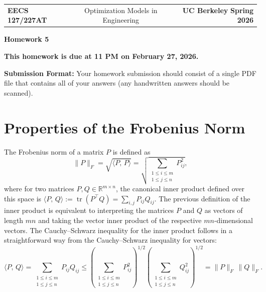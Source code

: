 \documentclass[10pt]{article}
\theoremstyle{definition}
\theoremstyle{plain}
\newcommand{\RR}{\mathbb{R}}
\DeclareMathOperator{\trace}{tr}
\begin{document}
\begin{center}
\begin{tabular}{lcr}
\textbf{EECS 127/227AT} & Optimization Models in Engineering & \textbf{UC Berkeley} \quad \textbf{Spring 2026}
\end{tabular}

\medskip
{\Large \textbf{Homework 5}}
\end{center}

\begin{tcolorbox}
\textbf{This homework is due at 11 PM on February 27, 2026.}

\textbf{Submission Format:} Your homework submission should consist of a single PDF file that contains all of your answers (any handwritten answers should be scanned).
\end{tcolorbox}

\section{Properties of the Frobenius Norm}

The Frobenius norm of a matrix $P$ is defined as
\begin{equation}
\|P\|_F = \sqrt{\langle P,\, P \rangle} = \sqrt{\sum_{\substack{1 \le i \le m \\ 1 \le j \le n}} P_{ij}^2},
\end{equation}
where for two matrices $P, Q \in \RR^{m \times n}$, the canonical inner product defined over this space is $\langle P,\, Q \rangle := \trace\!\left(P^\top Q\right) = \sum_{i,j} P_{ij} Q_{ij}$. The previous definition of the inner product is equivalent to interpreting the matrices $P$ and $Q$ as vectors of length $mn$ and taking the vector inner product of the respective $mn$-dimensional vectors. The Cauchy--Schwarz inequality for the inner product follows in a straightforward way from the Cauchy--Schwarz inequality for vectors:
\begin{equation}
\langle P,\, Q \rangle = \sum_{\substack{1 \le i \le m \\ 1 \le j \le n}} P_{ij} Q_{ij}
\le \left(\sum_{\substack{1 \le i \le m \\ 1 \le j \le n}} P_{ij}^2\right)^{1/2}
\left(\sum_{\substack{1 \le i \le m \\ 1 \le j \le n}} Q_{ij}^2\right)^{1/2}
= \|P\|_F \, \|Q\|_F.
\end{equation}
\end{document}
